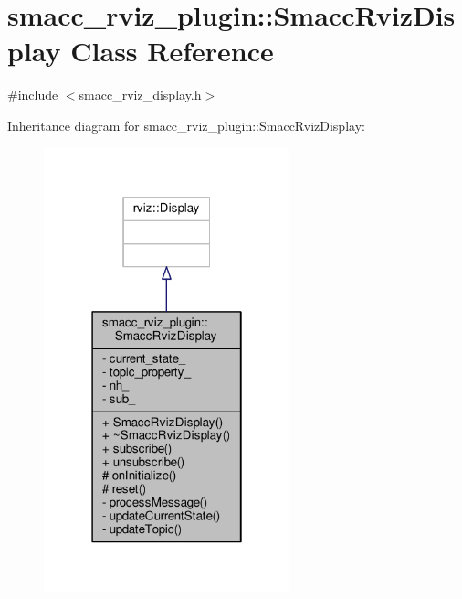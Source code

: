 \hypertarget{classsmacc__rviz__plugin_1_1SmaccRvizDisplay}{}\section{smacc\+\_\+rviz\+\_\+plugin\+:\+:Smacc\+Rviz\+Display Class Reference}
\label{classsmacc__rviz__plugin_1_1SmaccRvizDisplay}


{\ttfamily \#include $<$smacc\+\_\+rviz\+\_\+display.\+h$>$}



Inheritance diagram for smacc\+\_\+rviz\+\_\+plugin\+:\+:Smacc\+Rviz\+Display\+:
\nopagebreak
\begin{figure}[H]
\begin{center}
\leavevmode
\includegraphics[width=202pt]{classsmacc__rviz__plugin_1_1SmaccRvizDisplay__inherit__graph}
\end{center}
\end{figure}


